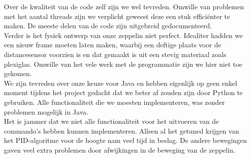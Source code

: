 \documentclass[eind]{penoverslag}
\begin{document}
Over de kwaliteit van de code zelf zijn we wel tevreden. Omwille van problemen met het aantal threads zijn we verplicht geweest deze een stuk effici\"enter te maken. De meeste delen van de code zijn uitgebreid gedocumenteerd. \\

Verder is het fysiek ontwerp van onze zeppelin niet perfect. Idealiter hadden we een nieuw frame moeten laten maken, waarbij een deftige plaats voor de distancesensor voorzien is en dat gemaakt is uit een stevig materiaal zoals plexiglas. Omwille van het vele werk met de programmatie zijn we hier niet toe gekomen. \\

We zijn tevreden over onze keuze voor Java en hebben eigenlijk op geen enkel moment tijdens het project gedacht dat we beter af zouden zijn door Python te gebruiken. Alle functionaliteit die we moesten implementeren, was zonder problemen mogelijk in Java. \\

Het is jammer dat we niet alle functionaliteit voor het uitvoeren van de commando's hebben kunnen implementeren. Alleen al het getuned krijgen van het PID-algoritme voor de hoogte nam veel tijd in beslag. De andere bewegingen gaven veel extra problemen door afwijkingen in de beweging van de zeppelin.
\end{document}
